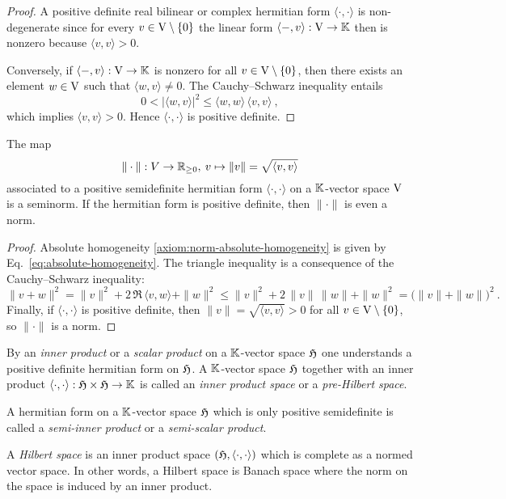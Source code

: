 \begin{proof}
  A positive definite real bilinear or complex  hermitian form $\langle \cdot , \cdot \rangle$ is 
  non-degenerate since for every $v \in \mathrm{V} \setminus \{ 0 \}$ the  linear form
  $\langle - ,v \rangle : \mathrm{V} \to \mathbb{K}$ then is  nonzero  because  $\langle v,v \rangle > 0$.

  Conversely, if $\langle - ,v \rangle : \mathrm{V} \to \mathbb{K}$ is nonzero for all 
  $v \in \mathrm{V} \setminus \{ 0 \}$, then  there exists an element $w \in \mathrm{V}$ such that 
  $\langle w,v \rangle \neq 0$. The Cauchy--Schwarz inequality entails
  \[
    0 < |\langle w,v \rangle |^2 \leq \langle w,w \rangle \, \langle v,v \rangle \ ,
  \]
  which implies $\langle v,v \rangle > 0$. Hence $\langle \cdot , \cdot \rangle$ is positive definite.
\end{proof}


\begin{proposition}
 The map 
 \[
  \| \cdot \| :V \to \mathbb{R}_{\geq 0} , \: v \mapsto \|v \| = \sqrt{\langle v , v \rangle} 
 \]
 associated to a positive semidefinite hermitian form 
 $\langle \cdot , \cdot \rangle$ on a $\mathbb{K}$-vector space $\mathrm{V}$ is a seminorm. 
 If the hermitian form is positive definite, then $\| \cdot \|$ is even  a norm. 
\end{proposition}
\begin{proof}
 Absolute homogeneity \ref{axiom:norm-absolute-homogeneity} is given by Eq.~\eqref{eq:absolute-homogeneity}.
 The triangle inequality is a consequence of the Cauchy--Schwarz inequality:
 \[
   \| v + w \|^2 =   \| v\|^2 + 2 \, \Re \, \langle  v ,  w \rangle + \| w\|^2 \leq
    \| v\|^2 + 2 \, \|  v \| \, \| w \| + \| w\|^2 = \big(\| v\|+\| w\| \big)^2 \ .
 \] 
 Finally, if $\langle \cdot , \cdot \rangle$ is positive definite, then 
 $\| v \| = \sqrt{\langle v , v \rangle} > 0 $ for all $v \in \mathrm{V} \setminus \{ 0 \}$,
 so $\| \cdot \|$ is  a norm.
\end{proof}


\begin{definition} 
\label{def:hilbert-space}
By an \emph{inner product} or a \emph{scalar product} on a $\mathbb{K}$-vector space $\mathfrak{H}$ one 
understands a positive definite hermitian form on $\mathfrak{H}$. A $\mathbb{K}$-vector space $\mathfrak{H}$ 
together with an inner product $\langle \cdot , \cdot \rangle : \mathfrak{H} \times \mathfrak{H} \to \mathbb{K}$ is 
called an \emph{inner product space} or a \emph{pre-Hilbert space}. 

A hermitian form on a  $\mathbb{K}$-vector space $\mathfrak{H}$ which is only positive semidefinite is called a \emph{semi-inner product} or a \emph{semi-scalar product}.

A \emph{Hilbert space} is an inner product space  $(\mathfrak{H} , \langle \cdot , \cdot \rangle)$  which is 
complete as a normed vector space. In other words, a Hilbert space is Banach space where the 
norm on the space is induced by an inner product.
\end{definition}

